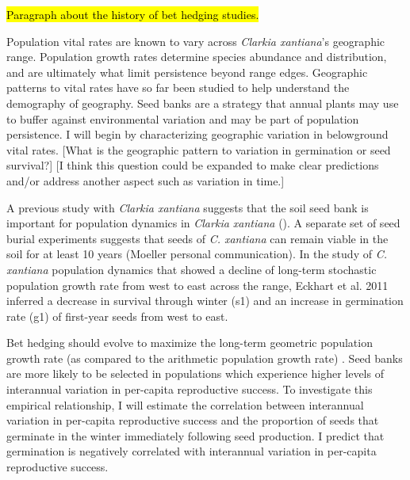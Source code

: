 \documentclass[12pt, oneside, titlepage]{article}   	%
\begin{document}

\hypertarget{bet-hedging-history}{\hl{Paragraph about the history of bet hedging studies.}}

Population vital rates are known to vary across \textit{Clarkia xantiana}'s geographic range. Population growth rates determine species abundance and distribution, and are ultimately what limit persistence beyond range edges. Geographic patterns to vital rates have so far been studied to help understand the demography of geography. Seed banks are a strategy that annual plants may use to buffer against environmental variation and may be part of population persistence. I will begin by characterizing geographic variation in belowground vital rates. [What is the geographic pattern to variation in germination or seed survival?] [I think this question could be expanded to make clear predictions and/or address another aspect such as variation in time.]

A previous study with \textit{Clarkia xantiana} suggests that the soil seed bank is important for population dynamics in \textit{Clarkia xantiana} (\cite{eckhart2011}). A separate set of seed burial experiments suggests that seeds of \textit{C. xantiana} can remain viable in the soil for at least 10 years (Moeller personal communication). In the study of \textit{C. xantiana} population dynamics that showed a decline of long-term stochastic population growth rate from west to east across the range, Eckhart et al. 2011 inferred a decrease in survival through winter (s1) and an increase in germination rate (g1) of first-year seeds from west to east.

Bet hedging should evolve to maximize the long-term geometric population growth rate (as compared to the arithmetic population growth rate) \cite{cohen1966,cohen1968,ellner1985,ellner1985a}. Seed banks are more likely to be selected in populations which experience higher levels of interannual variation in per-capita reproductive success. To investigate this empirical relationship, I will estimate the correlation between interannual variation in per-capita reproductive success and the proportion of seeds that germinate in the winter immediately following seed production. I predict that germination is negatively correlated with interannual variation in per-capita reproductive success. %
\end{document}
